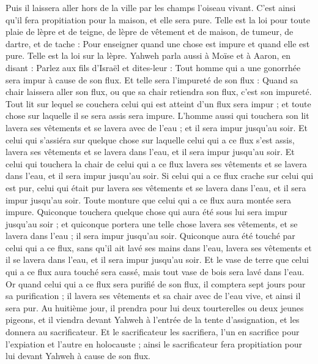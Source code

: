 \begin{multicols}{2}
Puis il laissera aller hors de la ville par les champs l'oiseau vivant. C'est ainsi qu'il fera propitiation pour la maison, et elle sera pure.
Telle est la loi pour toute plaie de lèpre et de teigne,
de lèpre de vêtement et de maison,
de tumeur, de dartre, et de tache :
Pour enseigner quand une chose est impure et quand elle est pure. Telle est la loi sur la lèpre.
\VerseOne{}Yahweh parla aussi à Moïse et à Aaron, en disant :
Parlez aux fils d'Israël et dites-leur : Tout homme qui a une gonorrhée sera impur à cause de son flux.
Et telle sera l'impureté de son flux : Quand sa chair laissera aller son flux, ou que sa chair retiendra son flux, c'est son impureté.
Tout lit sur lequel se couchera celui qui est atteint d'un flux sera impur ; et toute chose sur laquelle il se sera assis sera impure.
L'homme aussi qui touchera son lit lavera ses vêtements et se lavera avec de l'eau ; et il sera impur jusqu'au soir.
Et celui qui s'assiéra sur quelque chose sur laquelle celui qui a ce flux s'est assis, lavera ses vêtements et se lavera dans l'eau, et il sera impur jusqu'au soir.
Et celui qui touchera la chair de celui qui a ce flux lavera ses vêtements et se lavera dans l'eau, et il sera impur jusqu'au soir.
Si celui qui a ce flux crache sur celui qui est pur, celui qui était pur lavera ses vêtements et se lavera dans l'eau, et il sera impur jusqu'au soir.
Toute monture que celui qui a ce flux aura montée sera impure.
Quiconque touchera quelque chose qui aura été sous lui sera impur jusqu'au soir ; et quiconque portera une telle chose lavera ses vêtements, et se lavera dans l'eau ; il sera impur jusqu'au soir.
Quiconque aura été touché par celui qui a ce flux, sans qu'il ait lavé ses mains dans l'eau, lavera ses vêtements et il se lavera dans l'eau, et il sera impur jusqu'au soir.
Et le vase de terre que celui qui a ce flux aura touché sera cassé, mais tout vase de bois sera lavé dans l'eau.
Or quand celui qui a ce flux sera purifié de son flux, il comptera sept jours pour sa purification ; il lavera ses vêtements et sa chair avec de l'eau vive, et ainsi il sera pur.
Au huitième jour, il prendra pour lui deux tourterelles ou deux jeunes pigeons, et il viendra devant Yahweh à l'entrée de la tente d'assignation, et les donnera au sacrificateur.
Et le sacrificateur les sacrifiera, l'un en sacrifice pour l'expiation et l'autre en holocauste ; ainsi le sacrificateur fera propitiation pour lui devant Yahweh à cause de son flux.

\end{multicols}
